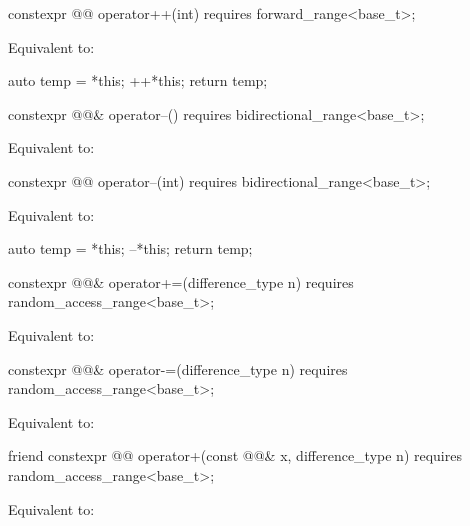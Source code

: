 \begin{itemdecl}
constexpr @@ operator++(int) requires forward_range<base_t>;
\end{itemdecl}
	\begin{itemdescr}
	\pnum
\effects Equivalent to:
\begin{codeblock}
auto temp = *this;
++*this;
return temp;
\end{codeblock}
\end{itemdescr}

\begin{itemdecl}
constexpr @@& operator--() requires bidirectional_range<base_t>;
\end{itemdecl}
\begin{itemdescr}
\pnum
\effects Equivalent to: 
\end{itemdescr}

\begin{itemdecl}
constexpr @@ operator--(int) requires bidirectional_range<base_t>;
\end{itemdecl}
\begin{itemdescr}
	\pnum
	\effects Equivalent to:
\begin{codeblock}
auto temp = *this;
--*this;
return temp;
\end{codeblock}
\end{itemdescr}

\begin{itemdecl}
constexpr @@& operator+=(difference_type n) requires random_access_range<base_t>;
\end{itemdecl}
\begin{itemdescr}
	\pnum
	\effects Equivalent to: 
\end{itemdescr}

\begin{itemdecl}
constexpr @@& operator-=(difference_type n) requires random_access_range<base_t>;
\end{itemdecl}
\begin{itemdescr}
	\pnum
	\effects Equivalent to: 
\end{itemdescr}

\begin{itemdecl}
friend constexpr @@ operator+(const @@& x, difference_type n)
  requires random_access_range<base_t>;
\end{itemdecl}
\begin{itemdescr}
	\pnum
	\effects Equivalent to: 
\end{itemdescr}

